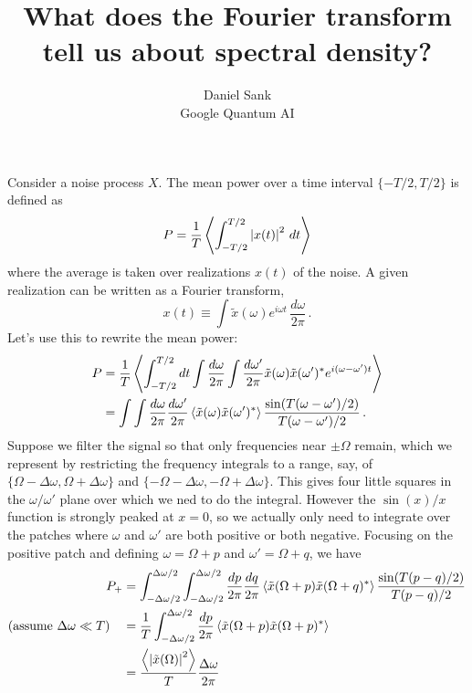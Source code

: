 \documentclass{article}
\title{What does the Fourier transform tell us about spectral density?}
\author{Daniel Sank \\ \small{Google Quantum AI}}
\begin{document}
\maketitle


Consider a noise process $X$.
The mean power over a time interval $\{-T/2,T/2\}$ is defined as
\begin{equation}
P = \frac{1}{T} \left \langle \int_{-T/2}^{T/2} \left \lvert x(t) \right \rvert^2 \, dt \right \rangle
\end{equation}
where the average is taken over realizations $x(t)$ of the noise.
A given realization can be written as a Fourier transform,
\begin{equation}
x(t) \equiv
\int \tilde{x}(\omega) e^{i \omega t} \, \frac{d \omega}{2\pi} \, .
\end{equation}
Let's use this to rewrite the mean power:
\begin{align}
P
&= \frac{1}{T}\left \langle 
\int_{-T/2}^{T/2} dt
\int \frac{d\omega}{2\pi}
\int \frac{d\omega'}{2\pi}
\tilde{x}(\omega) \tilde{x}(\omega')^*
e^{i(\omega - \omega')t} \right \rangle \nonumber \\
&= \int \int \frac{d\omega}{2\pi} \frac{d\omega'}{2\pi}
\left \langle \tilde{x}(\omega)\tilde{x}(\omega')^* \right \rangle
\frac{\sin(T(\omega - \omega')/2)}{T (\omega - \omega')/2} \, .
\end{align}
Suppose we filter the signal so that only frequencies near $\pm \Omega$ remain, which we represent by restricting the frequency integrals to a range, say, of $\{\Omega-\Delta \omega, \Omega+\Delta \omega\}$ and $\{-\Omega - \Delta \omega, -\Omega + \Delta \omega\}$.
This gives four little squares in the $\omega/\omega'$ plane over which we ned to do the integral.
However the $\sin(x)/x$ function is strongly peaked at $x=0$, so we actually only need to integrate over the patches where $\omega$ and $\omega'$ are both positive or both negative.
Focusing on the positive patch and defining $\omega = \Omega + p$ and $\omega' = \Omega + q$, we have
\begin{align}
P_+ &=
  \int_{-\Delta \omega/2}^{\Delta\omega/2}
  \int_{-\Delta \omega/2}^{\Delta\omega/2}
  \frac{dp}{2\pi} \frac{dq}{2\pi}
  \left \langle \tilde{x}(\Omega+p)\tilde{x}(\Omega+q)^* \right \rangle \frac{\sin(T(p-q)/2)}{T(p-q)/2} \nonumber \\
  (\text{assume }\Delta \omega \ll T) \quad &=
  \frac{1}{T} \int_{-\Delta \omega/2}^{\Delta \omega / 2}
  \frac{dp}{2\pi} \left \langle \tilde{x}(\Omega + p) \tilde{x}(\Omega + p)^* \right \rangle \nonumber \\
  &= \frac{\left \langle \left \lvert \tilde{x}(\Omega) \right \rvert^2 \right \rangle}{T} \frac{\Delta \omega}{2 \pi}
\end{align}
\end{document}
